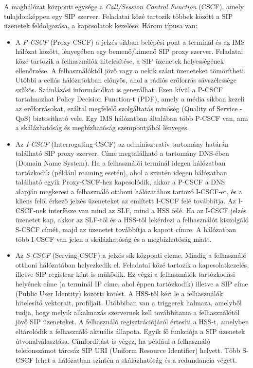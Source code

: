 A maghálózat központi egysége a \emph{Call/Session Control Function} (CSCF), amely tulajdonképpen egy SIP szerver. Feladatai közé tartozik többek között a SIP üzenetek feldolgozása, a kapcsolatok kezelése. Három típusa van:
\begin{itemize}
\item A \emph{P-CSCF} (Proxy-CSCF) a jelzés síkban belépési pont a terminál és az IMS hálózat között, lényegében egy bemenő/kimenő SIP proxy szerver. Feladatai közé tartozik a felhasználók hitelesítése, a SIP üzenetek helyességének ellenőrzése. A felhasználóktól jövő vagy a nekik szánt üzeneteket tömörítheti. Utóbbi a cellás hálózatokban előnyös, ahol a rádiós erőforrás sávszélessége szűkös. Számlázási információkat is generálhat. Ezen kívül a P-CSCF tartalmazhat Policy Decision Function-t (PDF), amely a média síkban kezeli az erőforrásokat, ezáltal megfelelő szolgáltatás minőség (Quality of Service - QoS) biztosítható vele. Egy IMS hálózatban általában több P-CSCF van, ami a skálázhatóság és megbízhatóság szempontjából lényeges.
\item Az \emph{I-CSCF} (Interrogating-CSCF) az adminisztratív tartomány határán található SIP proxy szerver. Címe megtalálható a tartomány DNS-ében (Domain Name System). Ha a felhasználói terminál idegen hálózatban tartózkodik (például roaming esetén), ahol a szintén idegen hálózatban található egyik Proxy-CSCF-hez kapcsolódik, akkor a P-CSCF a DNS alapján megkeresi a felhasználó otthoni hálózatához tartozó I-CSCF-et, és a kliens felől érkező jelzés üzeneteket az említett I-CSCF felé továbbítja. Az I-CSCF-nek interfésze van mind az SLF, mind a HSS felé. Ha az I-CSCF jelzés üzenetet kap, akkor az SLF-től és a HSS-től lekérdezi a felhasználót kiszolgáló S-CSCF címét, majd az üzenetet továbbítja a kapott címre. A hálózatban több I-CSCF van jelen a skálázhatóság és a megbízhatóság miatt.
\item Az \emph{S-CSCF} (Serving-CSCF) a jelzés sík központi eleme. Mindig a felhasználó otthoni hálózatában helyezkedik el. Feladatai közé tartozik a kapcsolatkezelés, illetve SIP registrar-ként is működik. Ez végzi a felhasználók tartózkodási helyének címe (a terminál IP címe, ahol éppen tartózkodik) illetve a SIP címe (Public User Identity) közötti kötést. A HSS-től kéri le a felhasználók hitelesítő vektorait, profiljait. Utóbbiban van a triggerek halmaza, amelyből tudja, hogy melyik alkalmazás szervernek kell továbbítania a felhasználótól jövő SIP üzeneteket. A felhasználó regisztrációjáról értesíti a HSS-t, amelyben eltárolódik a felhasználó aktuális állapota. Egyik fő funkciója a SIP üzenetek útvonalválasztása. Címfordítást is végez, ha például a felhasználó telefonszámot tárcsáz SIP URI (Uniform Resource Identifier) helyett. Több S-CSCF lehet a hálózatban szintén a skálázhatóság és a redundancia végett.
\end{itemize}

